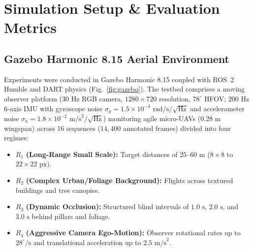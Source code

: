\documentclass[conference]{IEEEtran}
\begin{document}
\section{Simulation Setup \& Evaluation Metrics}

\subsection{Gazebo Harmonic 8.15 Aerial Environment}
Experiments were conducted in Gazebo Harmonic 8.15 coupled with ROS~2 Humble and DART physics (Fig.~\ref{fig:gazebo}). The testbed comprises a moving observer platform ($30\text{ Hz}$ RGB camera, $1280 \times 720$ resolution, $78^\circ$ HFOV; $200\text{ Hz}$ 6-axis IMU with gyroscope noise $\sigma_g = 1.5 \times 10^{-3}\text{ rad/s/}\sqrt{\text{Hz}}$ and accelerometer noise $\sigma_a = 1.8 \times 10^{-2}\text{ m/s}^2/\sqrt{\text{Hz}}$) monitoring agile micro-UAVs ($0.28\text{ m}$ wingspan) across 16 sequences ($14,400$ annotated frames) divided into four regimes:
\begin{itemize}
    \item $R_1$ \textbf{(Long-Range Small Scale):} Target distances of $25\text{--}60\text{ m}$ ($8 \times 8$ to $22 \times 22\text{ px}$).
    \item $R_2$ \textbf{(Complex Urban/Foliage Background):} Flights across textured buildings and tree canopies.
    \item $R_3$ \textbf{(Dynamic Occlusion):} Structured blind intervals of $1.0\text{ s}$, $2.0\text{ s}$, and $3.0\text{ s}$ behind pillars and foliage.
    \item $R_4$ \textbf{(Aggressive Camera Ego-Motion):} Observer rotational rates up to $28^\circ/\text{s}$ and translational acceleration up to $2.5\text{ m/s}^2$.
\end{itemize}
\end{document}
